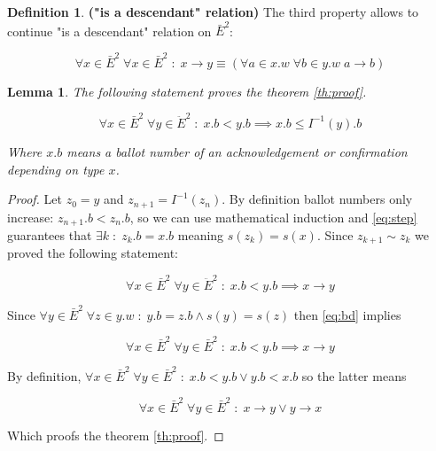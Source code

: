 \documentclass[12pt]{article}
\newtheorem{lemma}[theorem]{Lemma}
\theoremstyle{definition}
\newtheorem*{definition}{Definition}
\begin{document}
\begin{appendices}
\begin{definition}{\bf("is a descendant" relation)}
  The third property allows to continue "is a descendant" relation on $\bar{E}^2$:
  
  \begin{equation}
    \forall x \in \bar{E}^2 \; \forall x \in \bar{E}^2 \;:\; x \to y \equiv (\forall a \in x.w \; \forall b \in y.w \; a \to b)
  \end{equation}
\end{definition}

\begin{lemma}
  The following statement proves the theorem \ref{th:proof}.

  \begin{equation} \label{eq:step}
    \forall x \in \bar{E}^2 \; \forall y \in \ddot{E}^2 \;:\; x.b < y.b \implies x.b \leq I^{-1}(y).b
  \end{equation}

  Where $x.b$ means a ballot number of an acknowledgement or confirmation depending on type $x$.
\end{lemma}

\begin{proof}
  Let $z_0 = y$ and $z_{n+1} = I^{-1}(z_{n})$. By definition ballot numbers only increase: $z_{n+1}.b < z_{n}.b$, so we can use mathematical induction and \ref{eq:step} guarantees that $\exists k \;:\; z_k.b = x.b$ meaning $s(z_k) = s(x)$. Since $z_{k+1} \sim z_k$ we proved the following statement:

  \begin{equation} \label{eq:bd}
    \forall x \in \bar{E}^2 \; \forall y \in \ddot{E}^2 \;:\; x.b < y.b \implies x \to y
  \end{equation}

  Since $\forall y \in \bar{E}^2 \; \forall z \in y.w \;:\; y.b=z.b \land s(y)=s(z)$ then \ref{eq:bd} implies

  \begin{equation}
    \forall x \in \bar{E}^2 \; \forall y \in \bar{E}^2 \;:\; x.b < y.b \implies x \to y
  \end{equation}

  By definition, $\forall x \in \bar{E}^2 \; \forall y \in \bar{E}^2 \;:\; x.b < y.b \lor y.b < x.b$ so the latter means

  \begin{equation}
    \forall x \in \bar{E}^2 \; \forall y \in \bar{E}^2 \;:\; x \to y \lor y \to x
  \end{equation}

  Which proofs the theorem \ref{th:proof}.
\end{proof}


\end{appendices}
\end{document}
